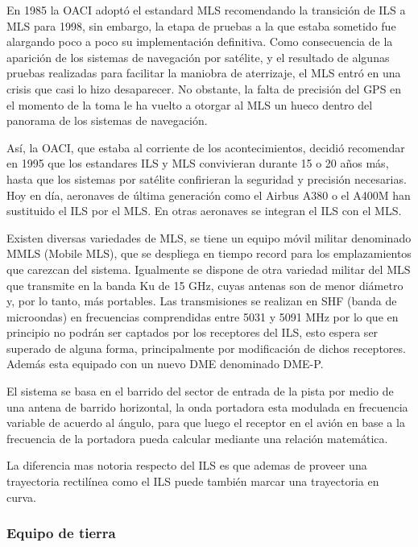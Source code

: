 En 1985 la OACI adoptó el estandard MLS recomendando la transición de ILS a MLS para
1998, sin embargo, la etapa de pruebas a la que estaba sometido fue alargando poco a poco su
implementación definitiva. Como consecuencia de la aparición de los sistemas de navegación por
satélite, y el resultado de algunas pruebas realizadas para facilitar la maniobra de aterrizaje, el MLS
entró en una crisis que casi lo hizo desaparecer. No obstante, la falta de precisión del GPS en el
momento de la toma le ha vuelto a otorgar al MLS un hueco dentro del panorama de los sistemas
de navegación.

Así, la OACI, que estaba al corriente de los acontecimientos, decidió recomendar en 1995 que
los estandares ILS y MLS convivieran durante 15 o 20 años más, hasta que los sistemas por satélite
confirieran la seguridad y precisión necesarias. Hoy en día, aeronaves de última generación como el
Airbus A380 o el A400M han sustituido el ILS por el MLS. En otras aeronaves se integran el ILS
con el MLS.

Existen diversas variedades de MLS, se tiene un equipo móvil militar denominado MMLS (Mobile
MLS), que se despliega en tiempo record para los emplazamientos que carezcan del sistema. Igualmente se dispone de otra variedad militar del MLS que transmite en la banda Ku de 15 GHz, cuyas
antenas son de menor diámetro y, por lo tanto, más portables.
Las transmisiones se realizan en SHF (banda de microondas) en frecuencias comprendidas entre
5031 y 5091 MHz por lo que en principio no podrán ser captados por los receptores del ILS, esto
espera ser superado de alguna forma, principalmente por modificación de dichos receptores. Además
esta equipado con un nuevo DME denominado DME-P.

El sistema se basa en el barrido del sector de entrada de la pista por medio de una antena de
barrido horizontal, la onda portadora esta modulada en frecuencia variable de acuerdo al ángulo, para
que luego el receptor en el avión en base a la frecuencia de la portadora pueda calcular mediante una
relación matemática.

La diferencia mas notoria respecto del ILS es que ademas de proveer una trayectoria rectilínea
como el ILS puede también marcar una trayectoria en curva.

\subsubsection{Equipo de tierra}
\label{sec:06.MLS.equipoTierra}

